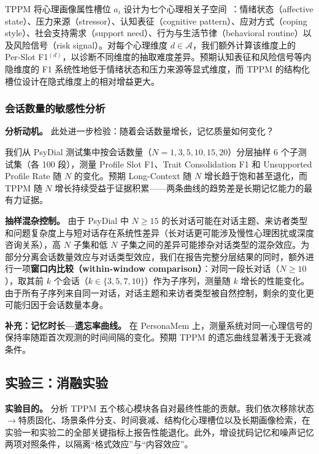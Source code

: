 \documentclass[12pt,a4paper]{article}
\newcommand{\methodname}{\textsc{TPPM}}
\begin{document}
TPPM 将心理画像属性槽位 $a_i$ 设计为七个心理相关子空间~\cite{engel1977biopsychosocial,trzepacz1993mse}：情绪状态（affective state）、压力来源（stressor）、认知表征（cognitive pattern）、应对方式（coping style）、社会支持需求（support need）、行为与生活节律（behavioral routine）以及风险信号（risk signal）。对每个心理维度 $d \in \mathcal{A}$，我们额外计算该维度上的 Per-Slot F1$^{(d)}$，以诊断不同维度的抽取难度差异。预期认知表征和风险信号等内隐维度的 F1 系统性地低于情绪状态和压力来源等显式维度，而 TPPM 的结构化槽位设计在隐式维度上的相对增益更大。

\subsubsection{会话数量的敏感性分析}

\textbf{分析动机。} 此处进一步检验：随着会话数量增长，记忆质量如何变化？

我们从 PsyDial 测试集中按会话数量（$N=1,3,5,10,15,20$）分层抽样 6 个子测试集（各 100 段），测量 Profile Slot F1、Trait Consolidation F1 和 Unsupported Profile Rate 随 $N$ 的变化。预期 Long-Context 随 $N$ 增长趋于饱和甚至退化，而 TPPM 随 $N$ 增长持续受益于证据积累——两条曲线的趋势差是长期记忆能力的最有力证据。

\textbf{抽样混杂控制。} 由于 PsyDial 中 $N \geq 15$ 的长对话可能在对话主题、来访者类型和问题复杂度上与短对话存在系统性差异（长对话更可能涉及慢性心理困扰或深度咨询关系），高 $N$ 子集和低 $N$ 子集之间的差异可能掺杂对话类型的混杂效应。为部分分离会话数量效应与对话类型效应，我们在报告完整分层结果的同时，额外进行一项\textbf{窗口内比较（within-window comparison）}：对同一段长对话（$N \geq 10$），取其前 $k$ 个会话（$k \in \{3, 5, 7, 10\}$）作为子序列，测量随 $k$ 增长的性能变化。由于所有子序列来自同一对话，对话主题和来访者类型被自然控制，剩余的变化更可能归因于会话数量本身。

\textbf{补充：记忆时长—遗忘率曲线。} 在 PersonaMem 上，测量系统对同一心理信号的保持率随距首次观测的时间间隔的变化。预期 \methodname{} 的遗忘曲线显著浅于无衰减条件。

\subsection{实验三：消融实验}
\label{sec:exp3}

\textbf{实验目的。} 分析 TPPM 五个核心模块各自对最终性能的贡献。我们依次移除状态$\to$特质固化、场景条件分支、时间衰减、结构化心理槽位以及长期画像检索，在实验一和实验二的全部关键指标上报告性能退化。此外，增设扰码记忆和噪声记忆两项对照条件，以隔离``格式效应''与``内容效应''。
\end{document}
